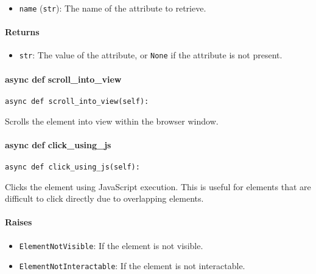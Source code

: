 \documentclass{article}
\begin{document}
\begin{itemize}
    \item \lstinline[style=pythonstyle]|name| (\lstinline[style=pythonstyle]|str|): The name of the attribute to retrieve.
\end{itemize}

\paragraph{Returns}

\begin{itemize}
    \item \lstinline[style=pythonstyle]|str|: The value of the attribute, or \lstinline[style=pythonstyle]|None| if the attribute is not present.
\end{itemize}

\paragraph{async def scroll\_into\_view}

\begin{lstlisting}[style=pythonstyle]
async def scroll_into_view(self):
\end{lstlisting}

\noindent Scrolls the element into view within the browser window.

\paragraph{async def click\_using\_js}

\begin{lstlisting}[style=pythonstyle]
async def click_using_js(self):
\end{lstlisting}

\noindent Clicks the element using JavaScript execution. This is useful for elements that are difficult to click directly due to overlapping elements.

\paragraph{Raises}

\begin{itemize}
    \item \lstinline[style=pythonstyle]|ElementNotVisible|: If the element is not visible.
    \item \lstinline[style=pythonstyle]|ElementNotInteractable|: If the element is not interactable.
\end{itemize}
\end{document}
